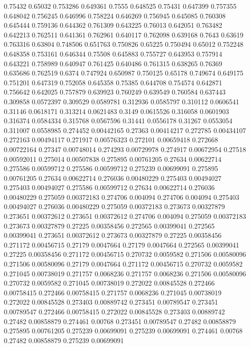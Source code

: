 0.75432 0.65032
0.753286 0.649361
0.7555 0.648525
0.75431 0.647399
0.757355 0.648042
0.756245 0.646996
0.758224 0.646269
0.756945 0.645085
0.760308 0.645444
0.759136 0.644362
0.761309 0.643225
0.76013 0.642051
0.763482 0.642213
0.762511 0.641361
0.762961 0.640117
0.762098 0.639168
0.7643 0.63619
0.763316 0.63804
0.748506 0.651763
0.750826 0.65225
0.750494 0.65012
0.752248 0.648358
0.753161 0.646344
0.75508 0.645883
0.755727 0.643953
0.757914 0.643221
0.758989 0.640947
0.761425 0.640486
0.761315 0.638265
0.76369 0.635686
0.762519 0.6374
0.747924 0.650987
0.750125 0.65178
0.749674 0.649175
0.751201 0.647319
0.752058 0.645358
0.75385 0.644708
0.754574 0.642871
0.756642 0.642025
0.757879 0.639923
0.760249 0.639549
0.760584 0.637443
0.309858 0.0572397
0.309529 0.0589781
0.312936 0.0585797
0.310112 0.0606541
0.31146 0.0618171
0.313214 0.0621483
0.3149 0.0615526
0.316058 0.0601903
0.316374 0.0584334
0.315768 0.0567596
0.31441 0.0556178
0.31267 0.0553054
0.311007 0.0558985
0.274452 0.00442165
0.27363 0.00414217
0.272785 0.00434107
0.272163 0.00494117
0.271917 0.00576323
0.272101 0.00659418
0.272668 0.00722164
0.27347 0.00748014
0.274293 0.00729978
0.274917 0.00672954
0.27518 0.00592011
0.275014 0.00507838
0.275895 0.00761205
0.27634 0.00622714
0.275586 0.00599712
0.275586 0.00599712
0.275239 0.00699091
0.275895 0.00761205
0.27634 0.00622714
0.276036 0.00480229
0.275403 0.00494027
0.275403 0.00494027
0.275586 0.00599712
0.27634 0.00622714
0.276036 0.00480229
0.275059 0.00372183
0.274706 0.004094
0.274706 0.004094
0.275403 0.00494027
0.276036 0.00480229
0.275059 0.00372183
0.273673 0.00327879
0.273651 0.00372612
0.273651 0.00372612
0.274706 0.004094
0.275059 0.00372183
0.273673 0.00327879
0.27225 0.00358456
0.272565 0.00399041
0.272565 0.00399041
0.273651 0.00372612
0.273673 0.00327879
0.27225 0.00358456
0.271172 0.00456715
0.27179 0.0047664
0.27179 0.0047664
0.272565 0.00399041
0.27225 0.00358456
0.271172 0.00456715
0.270732 0.0059582
0.271506 0.00580096
0.271506 0.00580096
0.27179 0.0047664
0.271172 0.00456715
0.270732 0.0059582
0.271045 0.00738019
0.271757 0.0068236
0.271757 0.0068236
0.271506 0.00580096
0.270732 0.0059582
0.271045 0.00738019
0.272022 0.00845528
0.272466 0.00758415
0.272466 0.00758415
0.271757 0.0068236
0.271045 0.00738019
0.272022 0.00845528
0.273403 0.00889742
0.273451 0.00789547
0.273451 0.00789547
0.272466 0.00758415
0.272022 0.00845528
0.273403 0.00889742
0.27482 0.00858879
0.274461 0.00768
0.273451 0.00789547
0.27482 0.00858879
0.275895 0.00761205
0.275239 0.00699091
0.275239 0.00699091
0.274461 0.00768
0.27482 0.00858879
0.275239 0.00699091
